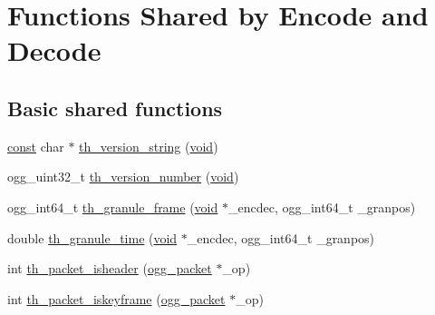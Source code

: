 \hypertarget{group__basefuncs}{}\section{Functions Shared by Encode and Decode}
\label{group__basefuncs}
\subsection*{Basic shared functions}
\begin{DoxyCompactItemize}
\item 
\hyperlink{zconf_8h_a2c212835823e3c54a8ab6d95c652660e}{const} char $\ast$ \hyperlink{group__basefuncs_ga04846066738d9f2024fc9961162b2dbc}{th\+\_\+version\+\_\+string} (\hyperlink{png_8h_ac9c84fa68bbad002983e35ce3663c686}{void})
\item 
ogg\+\_\+uint32\+\_\+t \hyperlink{group__basefuncs_gab723a75c0f95b3eb817f7f769846016b}{th\+\_\+version\+\_\+number} (\hyperlink{png_8h_ac9c84fa68bbad002983e35ce3663c686}{void})
\item 
ogg\+\_\+int64\+\_\+t \hyperlink{group__basefuncs_ga95b10e76fc4c05d0240ea2dfd9fd62bd}{th\+\_\+granule\+\_\+frame} (\hyperlink{png_8h_ac9c84fa68bbad002983e35ce3663c686}{void} $\ast$\+\_\+encdec, ogg\+\_\+int64\+\_\+t \+\_\+granpos)
\item 
double \hyperlink{group__basefuncs_ga707e1e281de788af0df39ef00f3fb432}{th\+\_\+granule\+\_\+time} (\hyperlink{png_8h_ac9c84fa68bbad002983e35ce3663c686}{void} $\ast$\+\_\+encdec, ogg\+\_\+int64\+\_\+t \+\_\+granpos)
\item 
int \hyperlink{group__basefuncs_ga02f3f38261a9b39452d8a5e6f8737cc1}{th\+\_\+packet\+\_\+isheader} (\hyperlink{structogg__packet}{ogg\+\_\+packet} $\ast$\+\_\+op)
\item 
int \hyperlink{group__basefuncs_gafe95cfd06f0fef413266c9168a66248a}{th\+\_\+packet\+\_\+iskeyframe} (\hyperlink{structogg__packet}{ogg\+\_\+packet} $\ast$\+\_\+op)
\end{DoxyCompactItemize}
